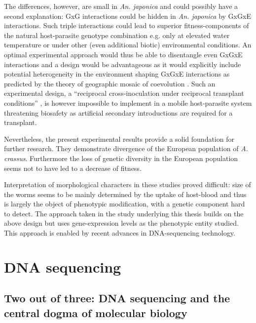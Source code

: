 The differences, however, are small in \textit{An. japonica} and could
possibly have a second explanation: GxG interactions could be hidden
in \textit{An. japonica} by GxGxE interactions. Such triple
interactions could lead to superior fitness-components of the natural
host-parasite genotype combination e.g. only at elevated water
temperature or under other (even additional biotic) environmental
conditions. An optimal experimental approach would thus be able to
disentangle even GxGxE interactions and a design would be advantageous
as it would explicitly include potential heterogeneity in the
environment shaping GxGxE interactions as predicted by the theory of
geographic mosaic of coevolution \cite{thompson2005geographic}. Such
an experimental design, a ``reciprocal cross-inoculation under
reciprocal transplant conditions'' \cite{pmid18419564}, is however
impossible to implement in a mobile host-parasite system threatening
biosafety as artificial secondary introductions are required for a
transplant.

Nevertheless, the present experimental results provide a solid
foundation for further research. They demonstrate divergence of the
European population of \textit{A. crassus}. Furthermore the loss of
genetic diversity in the European population
\cite{wielgoss_population_2008} seems not to have led to a decrease of
fitness.

Interpretation of morphological characters in these studies proved
difficult: size of the worms seems to be mainly determined by the
uptake of host-blood and thus is largely the object of phenotypic
modification, with a genetic component hard to detect. The approach
taken in the study underlying this thesis builds on the above design
but uses gene-expression levels as the phenotypic entity studied. This
approach is enabled by recent advances in DNA-sequencing technology.

\newpage

\section{DNA sequencing}

\subsection{Two out of three: DNA sequencing and the central dogma of
  molecular biology}
\label{sec:dm}



